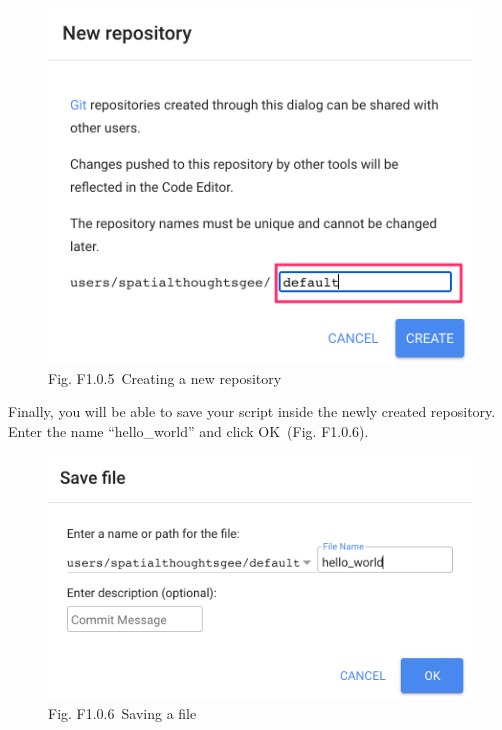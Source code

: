 \documentclass[
  letterpaper,
  DIV=11,
  numbers=noendperiod]{scrreprt}
\begin{document}
\begin{figure}

{\centering \includegraphics{./F1/image33.png}

}

\caption{Fig. F1.0.5~Creating a new repository}

\end{figure}

Finally, you will be able to save your script inside the newly created
repository. Enter the name ``hello\_world'' and click OK~(Fig. F1.0.6).

\begin{figure}

{\centering \includegraphics{./F1/image37.png}

}

\caption{Fig. F1.0.6~Saving a file}

\end{figure}
\end{document}
